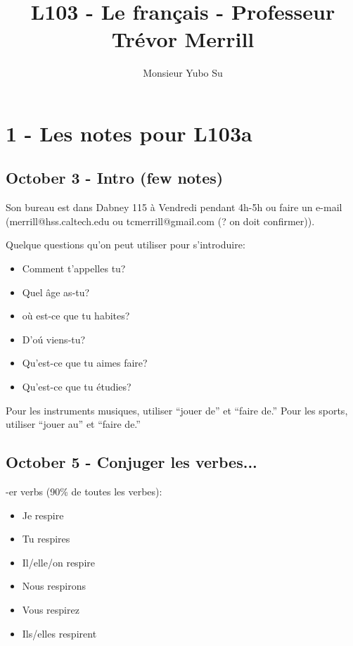 \documentclass{report}
\begin{document}
\title{L103 - Le fran\c{c}ais - Professeur Tr\'evor Merrill}
\author{Monsieur Yubo Su}
\date{ }

\maketitle

\tableofcontents

\chapter{1 - Les notes pour L103a}

\section{October 3 - Intro (few notes)}
Son bureau est dans Dabney 115 \`{a} Vendredi pendant 4h-5h ou faire un e-mail (merrill@hss.caltech.edu ou tcmerrill@gmail.com (? on doit confirmer)). 

Quelque questions qu'on peut utiliser pour s'introduire:

\begin{itemize}
\item Comment t'appelles tu?
\item Quel \^age as-tu?
\item o\`u est-ce que tu habites?
\item D'o\'u viens-tu?
\item Qu'est-ce que tu aimes faire?
\item Qu'est-ce que tu \'etudies?
\end{itemize}

Pour les instruments musiques, utiliser "`jouer de"' et "`faire de."' Pour les sports, utiliser "`jouer au"' et "`faire de."'

\section{October 5 - Conjuger les verbes...	}

-er verbs (90\% de toutes les verbes):

\begin{itemize}
\item Je respire
\item Tu respires
\item Il/elle/on respire
\item Nous respirons
\item Vous respirez
\item Ils/elles respirent
\end{itemize}
\end{document}
